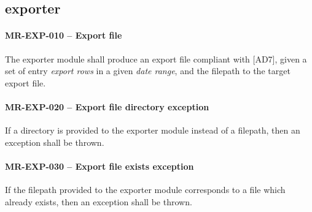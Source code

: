\subsection{exporter}
\paragraph{MR-EXP-010 -- Export file}
The exporter module shall produce an export file compliant with [AD7],
given a set of entry \emph{export rows} in a given \emph{date range},
and the filepath to the target export file.

\paragraph{MR-EXP-020 -- Export file directory exception}
If a directory is provided to the exporter module instead of a filepath,
then an exception shall be thrown.

\paragraph{MR-EXP-030 -- Export file exists exception}
If the filepath provided to the exporter module corresponds to
a file which already exists, then an exception shall be thrown.
